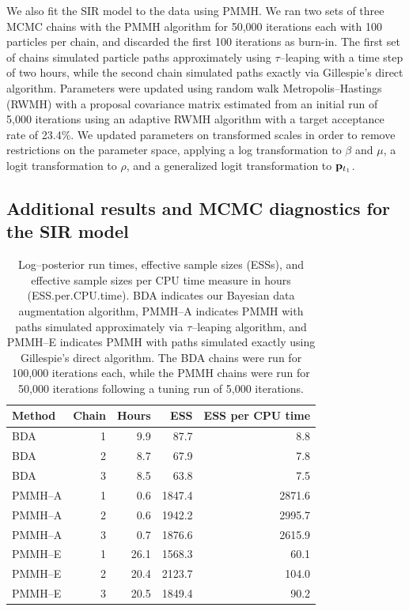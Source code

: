 We also fit the SIR model to the data using PMMH. We ran two sets of three MCMC chains with the PMMH algorithm for 50,000 iterations each with 100 particles per chain, and discarded the first 100 iterations as burn-in. The first set of chains simulated particle paths approximately using $ \tau $--leaping with a time step of two hours, while the second chain simulated paths exactly via Gillespie's direct algorithm. Parameters were updated using random walk Metropolis--Hastings (RWMH) with a proposal covariance matrix estimated from an initial run of 5,000 iterations using an adaptive RWMH algorithm with a target acceptance rate of 23.4\%. We updated parameters on transformed scales in  order to remove restrictions on the parameter space, applying a log transformation to $ \beta $ and $ \mu $, a logit transformation to $ \rho $, and a generalized logit transformation to $ \mathbf{p}_{t_1} $.

\newpage
\subsection{Additional results and MCMC diagnostics for the SIR model}
\begin{table}[htbp]
	\centering
	\begin{tabular}{lrrrr}
		\hline
		Method & Chain & Hours & ESS & ESS per CPU time \\ 
		\hline
		BDA &  1 & 9.9 & 87.7 & 8.8 \\ 
		BDA &  2 & 8.7 & 67.9 & 7.8 \\ 
		BDA &  3 & 8.5 & 63.8 & 7.5 \\ 
		PMMH--A &  1 & 0.6 & 1847.4 & 2871.6 \\ 
		PMMH--A &  2 & 0.6 & 1942.2 & 2995.7 \\ 
		PMMH--A &  3 & 0.7 & 1876.6 & 2615.9 \\ 
		PMMH--E &  1 & 26.1 & 1568.3 & 60.1 \\ 
		PMMH--E &  2 & 20.4 & 2123.7 & 104.0 \\ 
		PMMH--E &  3 & 20.5 & 1849.4 & 90.2 \\ 
		\hline
	\end{tabular}
	\caption{Log--posterior run times, effective sample sizes (ESSs), and effective sample sizes per CPU time measure in hours (ESS.per.CPU.time). BDA indicates our Bayesian data augmentation algorithm, PMMH--A indicates PMMH with paths simulated approximately via $ \tau $--leaping algorithm, and PMMH--E indicates PMMH with paths simulated exactly using Gillespie's direct algorithm. The BDA chains were run for 100,000 iterations each, while the PMMH chains were run for 50,000 iterations following a tuning run of 5,000 iterations.}
	\label{tab:sim1_sir_ess}
\end{table}

